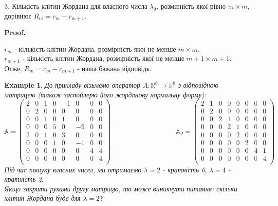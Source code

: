 \documentclass[a4paper, 10pt]{article}
\makeatletter
\theoremstyle{theoremdd}
\newtheorem{example}[theorem]{Example}
\renewenvironment{proof}[1][Proof.\\]{\par
\pushQED{\hfill \qed}%
\normalfont \topsep6\p@\@plus6\p@\relax
\trivlist
\item\relax
{\bfseries
#1\@addpunct{.}}\hspace\labelsep\ignorespaces
}{%
\popQED\endtrivlist\@endpefalse
}
\makeatother
\begin{document}
3. Кількість клітин Жордана для власного числа $\lambda_0$, розмірність якої рівно $m \times m$, дорівнює $R_m = r_m - r_{m+1}$.

\begin{proof}
$r_m$ - кількість клітин Жордана, розмірність якої не менше $m \times m$.\\
$r_{m+1}$ - кількість клітин Жордана, розмірність якої не менше $m+1 \times m+1$.\\
Отже, $R_m = r_m - r_{m+1}$ - наша бажана відповідь.
\end{proof}

\begin{example}
До прикладу візьмемо оператор $A: \mathbb{R}^8 \to \mathbb{R}^8$ з відповідною матрицею (також заспойлерю його жорданову нормальну форму):\\
$\mathbb{A} = \begin{pmatrix}
2 & 0 & 1 & 0 & -1 & 0 & 0 & 0 \\
0 & 2 & 0 & 0 & 0 & 0 & 0 & 0 \\
0 & 0 & 1 & 0 & 1 & 0 & 0 & 0 \\
0 & 0 & 0 & 5 & 0 & -9 & 0 & 0 \\
2 & 0 & 1 & 0 & 3 & 0 & 0 & 0 \\
0 & 0 & 0 & 1 & 0 & -1 & 0 & 0 \\
0 & 0 & 0 & 0 & 0 & 0 & 4 & 4 \\
0 & 0 & 0 & 0 & 0 & 0 & 0 & 4 \\
\end{pmatrix} \hspace{4cm} \mathbb{A}_J = \begin{pmatrix}
2 & 1 & 0 & 0 & 0 & 0 & 0 & 0 \\
0 & 2 & 0 & 0 & 0 & 0 & 0 & 0 \\
0 & 0 & 2 & 1 & 0 & 0 & 0 & 0 \\
0 & 0 & 0 & 2 & 1 & 0 & 0 & 0 \\
0 & 0 & 0 & 0 & 2 & 0 & 0 & 0 \\
0 & 0 & 0 & 0 & 0 & 2 & 0 & 0 \\
0 & 0 & 0 & 0 & 0 & 0 & 4 & 1 \\
0 & 0 & 0 & 0 & 0 & 0 & 0 & 4 \\
\end{pmatrix}$\\
Під час пошуку власних чисел, ми отримаємо $\lambda = 2$ - кратність 6, $\lambda = 4$ - кратність 2.\\
Якщо закрити руками другу матрицю, то може виникнути питання: скільки клітин Жордана буде для $\lambda = 2$?\\

\end{example}
\end{document}
